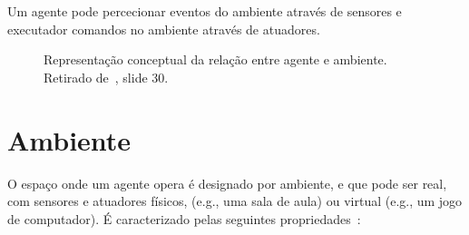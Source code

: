 Um agente pode percecionar eventos do ambiente através de sensores e executador comandos no ambiente através de atuadores.

\begin{figure}[H]
    \begin{center}
    \end{center}
    \caption{Representação conceptual da
    relação entre agente e ambiente.
    Retirado de~\cite{isel:iasa:slides:intro-eng-soft-parte-1}, slide 30.}\label{fig:modelo-agente-ambiente}
\end{figure}


\section{Ambiente}\label{sec:ambiente}

O espaço onde um agente opera é designado por ambiente, e que pode ser real, com sensores e atuadores físicos, (e.g., uma sala de aula) ou virtual (e.g., um jogo de computador).
É caracterizado pelas seguintes propriedades~\cite{ist:leic:resumos:agentes}:

